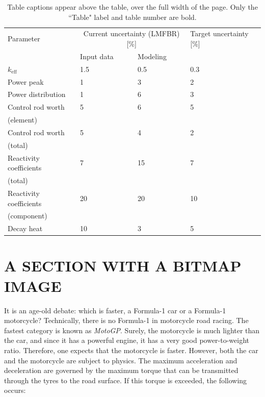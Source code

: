 \documentclass[12pt]{article}
\begin{document}
\begin{table}[ht]
  \begin{center}
    \caption{\label{tab::unc}Table captions appear above the table, over the full width of the page. Only the ``Table" label and table number are bold.}
    \begin{tabular}{llll}
    \toprule
    Parameter & \multicolumn{2}{c}{Current uncertainty (LMFBR) [\%]} & Target uncertainty [\%]\\
              & Input data                & Modeling &                    \\
    \midrule
    $k_\text{eff}$          & 1.5 & 0.5 & 0.3 \\
    Power peak              & 1   & 3   & 2   \\
    Power distribution      & 1   & 6   & 3   \\
    Control rod worth       & 5   & 6   & 5   \\
    (element)               &     &     &     \\
    Control rod worth       & 5   & 4   & 2   \\
    (total)                 &     &     &     \\
    Reactivity coefficients & 7   & 15  & 7   \\
    (total)                 &     &     &     \\
    Reactivity coefficients & 20  & 20  & 10  \\
    (component)             &     &     &     \\
    Decay heat              & 10  & 3   & 5   \\
    \bottomrule
    \end{tabular}
  \end{center}
\end{table}

%
\section{A SECTION WITH A BITMAP IMAGE} 
\label{sect::bitmap}

It is an age-old debate: which is faster, a Formula-1 car or a Formula-1 motorcycle? Technically, there is no Formula-1 in motorcycle road racing. The fastest category is known as \emph{MotoGP}. Surely, the motorcycle is much lighter than the car, and since it has a powerful engine, it has a very good power-to-weight ratio. Therefore, one expects that the motorcycle is faster. However, both the car and the motorcycle are subject to physics. The maximum acceleration and deceleration are governed by the maximum torque that can be transmitted through the tyres to the road surface. If this torque is exceeded, the following occurs:
\end{document}
